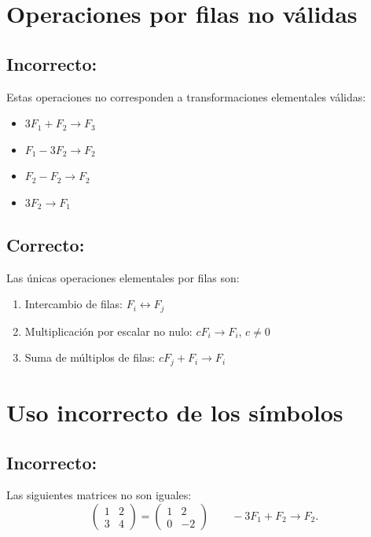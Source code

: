 \documentclass[a4,11pt]{aleph-notas}
\begin{document}
\section{Operaciones por filas no válidas}

\subsection*{Incorrecto:}

Estas operaciones no corresponden a transformaciones elementales válidas:
\begin{itemize}
    \item \(3F_1 + F_2 \to F_3\)
    \item \(F_1 - 3F_2 \to F_2\)
    \item \(F_2 - F_2 \to F_2\)
    \item \(3F_2 \to F_1\)
\end{itemize}


\subsection*{Correcto:}

Las únicas operaciones elementales por filas son:
\begin{enumerate}
    \item Intercambio de filas: \(F_i \leftrightarrow F_j\)
    \item Multiplicación por escalar no nulo: \(cF_i \to F_i\), \(c \neq 0\)
    \item Suma de múltiplos de filas: \(cF_j + F_i\to F_i\)
\end{enumerate}

\section{Uso incorrecto de los símbolos}

\subsection*{Incorrecto:}
Las siguientes matrices no son iguales:
\[
\begin{pmatrix}
1 & 2\\
3 & 4
\end{pmatrix}
=
\begin{pmatrix}
1 & 2\\
0 & -2
\end{pmatrix}
\qquad -3F_1 + F_2 \to F_2.
\]
\end{document}

